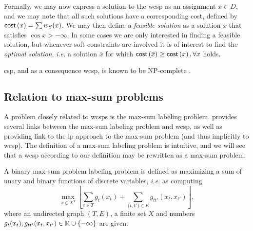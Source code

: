 Formally, we may now express a solution to the \gls{wcsp} as an assignment \({x} \in D\), and we may note that all such solutions have a corresponding cost, defined by \(\operatorname{\mathsf{cost}}\left({x}\right) = \sum w_S({x})\).
We may then define a \emph{feasible solution} as a solution \({x}\) that satisfies \(\cos{{x}} > -\infty\).
In some cases we are only interested in finding a feasible solution, but whenever soft constraints are involved it is of interest to find the \emph{optimal solution}, \emph{i.e.} a solution \(\bar{{x}}\) for which \(\cost{\bar{{x}}} \geq \cost{{x}}, \forall {x}\) holds.


\gls{csp}, and as a consequence \gls{wcsp}, is known to be NP-complete \parencite{Mackworth93}.

\subsection{Relation to max-sum problems}
A problem closely related to \glspl{wcsp} is the max-sum labeling problem.
\Textcite{Werner07} provides several links between the max-sum labeling problem and \gls{wcsp}, as well as providing link to the \gls{lp} approach to the max-sum problem (and thus implicitly to \gls{wcsp}).
The definition of a max-sum labeling problem is intuitive, and we will see that a \gls{wcsp} according to our definition may be rewritten as a max-sum problem.

\begin{definition}
	A binary max-sum problem labeling problem is defined as maximizing a sum of unary and binary functions of discrete variables, \emph{i.e.} as computing
	\begin{equation*}
		\max_{x\in X^T}\left[
			\sum_{t\in T}g_t(x_t) + \sum_{\{t,t'\}\in E}g_{tt'}(x_t,x_{t'})
		\right],
	\end{equation*}
	where an undirected graph \((T,E)\), a finite set \(X\) and numbers \(g_t(x_t), g_{tt'}(x_t,x_{t'}) \in \mathbb{R}\cup\{-\infty\}\) are given.
\end{definition}

